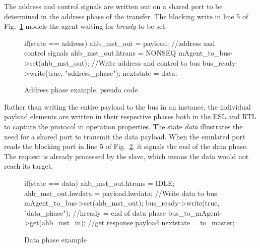 The address and control signals are written out on a shared port to be determined in the address phase of the transfer. The blocking write in line 5 of Fig.~\ref{fig:address-phase} models the agent waiting for \textit{hready} to be set. 

\begin{figure}[hbt] 
\begin{C++}
if(state == address){
  ahb_mst_out = payload; //address and control signals
  ahb_mst_out.htrans = NONSEQ
  mAgent_to_bus->set(ahb_mst_out); //Write address and control to bus
  bus_ready->write(true, "address_phase");
  nextstate = data;
}
\end{C++}
\caption{Address phase example, pseudo code}
\label{fig:address-phase}
\end{figure}

Rather than writing the entire payload to the bus in an instance, the individual payload elements are written in their respective phases both in the ESL and RTL to capture the protocol in operation properties. The state \textit{data} illustrates the need for a shared port to transmit the data payload. When the emulated port reads the blocking port in line 5 of Fig.~\ref{data-phase}, it signals the end of the data phase. The request is already processed by the slave, which means the data would not reach its target.
\newpage
\begin{figure}[h!]
\begin{C++}
if(state == data){
 ahb_mst_out.htrans = IDLE; 
 ahb_mst_out.hwdata = payload.hwdata; //Write data to bus
 mAgent_to_bus->set(ahb_mst_out); 
 bus_ready->write(true, "data_phase"); //hready = end of data phase
 bus_to_mAgent->get(ahb_mst_in); //get response payload
 nextstate = to_master;
}
\end{C++}
\caption{Data phase example}
\label{data-phase}
\end{figure}


 
